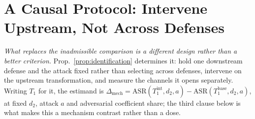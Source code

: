 \documentclass{article}
\begin{document}
\section{A Causal Protocol: Intervene Upstream, Not Across Defenses}
\label{sec:protocol}

\emph{What replaces the inadmissible comparison is a different design rather than a better criterion.} Prop.~\ref{prop:identification} determines it: hold one downstream defense and the attack fixed rather than selecting across defenses, intervene on the upstream transformation, and measure the channels it opens separately. Writing $T_1$ for it, the estimand is $\Delta_{\mathrm{mech}} = \mathrm{ASR}(T_1^{\mathrm{int}}, d_2, a) - \mathrm{ASR}(T_1^{\mathrm{base}}, d_2, a)$, at fixed $d_2$, attack $a$ and adversarial coefficient share; the third clause below is what makes this a mechanism contrast rather than a dose.
\end{document}
